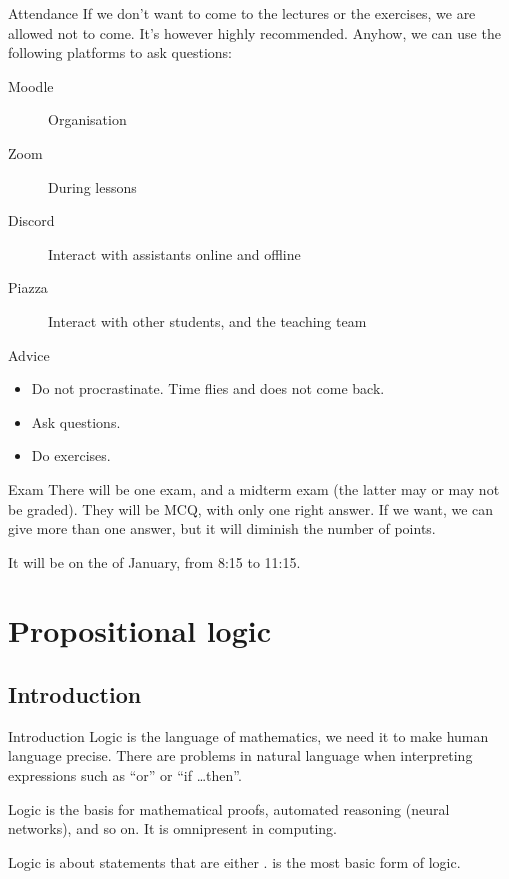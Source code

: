 \documentclass{article}
\begin{document}
\begin{parag}{Attendance}
If we don't want to come to the lectures or the exercises, we are allowed not to come. It's however highly recommended. Anyhow, we can use the following platforms to ask questions:
\begin{description}
    \item[Moodle] Organisation
    \item[Zoom] During lessons
    \item[Discord] Interact with assistants online and offline
    \item[Piazza] Interact with other students, and the teaching team
\end{description}
\end{parag}

\begin{parag}{Advice}
\begin{itemize}[left=0pt]
    \item Do not procrastinate. Time flies and does not come back.
    \item Ask questions.
    \item Do exercises.
\end{itemize}
\end{parag}

\begin{parag}{Exam}
There will be one exam, and a midterm exam (the latter may or may not be graded). They will be MCQ, with only one right answer. If we want, we can give more than one answer, but it will diminish the number of points.

It will be on the  of January, from 8:15 to 11:15.
\end{parag}

\section{Propositional logic}
\subsection{Introduction}
\begin{parag}{Introduction}
    Logic is the language of mathematics, we need it to make human language precise. There are problems in natural language when interpreting expressions such as ``or'' or ``if \ldots then''.

    Logic is the basis for mathematical proofs, automated reasoning (neural networks), and so on. It is omnipresent in computing.

    Logic is about statements that are either .  is the most basic form of logic.
\end{parag}
\end{document}
